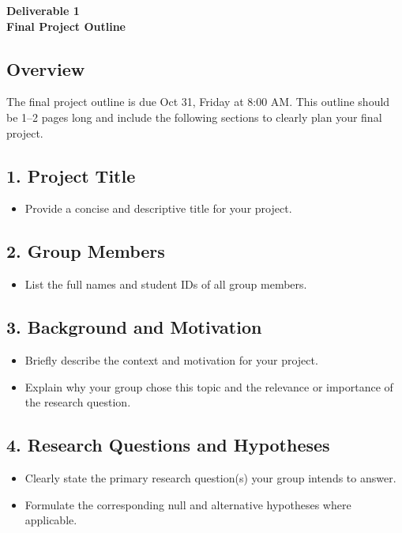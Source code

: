 \documentclass[12pt]{article}
\begin{document}
\begin{center}
\textbf{\Large Deliverable 1 \\ Final Project Outline} 
\end{center}

\subsection*{Overview}
The final project outline is due Oct 31, Friday at 8:00 AM.  
This outline should be 1--2 pages long and include the following sections to clearly plan your final project.

\subsection*{1. Project Title}
\begin{itemize}
    \item Provide a concise and descriptive title for your project.
\end{itemize}

\subsection*{2. Group Members}
\begin{itemize}
    \item List the full names and student IDs of all group members.
\end{itemize}

\subsection*{3. Background and Motivation}
\begin{itemize}
    \item Briefly describe the context and motivation for your project.  
    \item Explain why your group chose this topic and the relevance or importance of the research question.
\end{itemize}

\subsection*{4. Research Questions and Hypotheses}
\begin{itemize}
    \item Clearly state the primary research question(s) your group intends to answer.  
    \item Formulate the corresponding null and alternative hypotheses where applicable.
\end{itemize}
\end{document}
